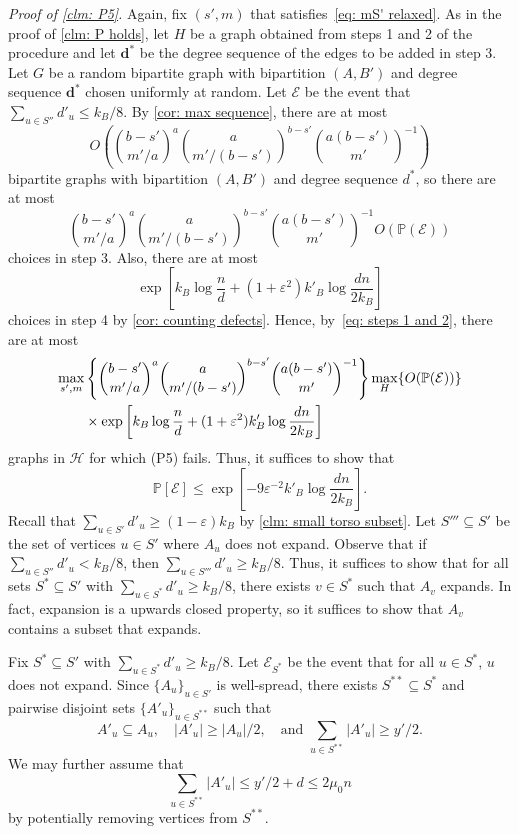 \documentclass[11pt]{article}
\newcommand{\eps}{\varepsilon}
\def\P{\mathbb P}
\theoremstyle{plain}
\begin{document}
\medskip
\noindent\textit{Proof of \cref{clm: P5}.}
Again, fix $(s',m)$ that satisfies~\eqref{eq: mS' relaxed}. As in the proof of \cref{clm: P holds}, let $H$ be a graph obtained from steps 1 and 2 of the procedure and let $\mathbf d^*$ be the degree sequence of the edges to be added in step 3. Let $G$ be a random bipartite graph with bipartition $(A, B')$ and degree sequence $\mathbf d^*$ chosen uniformly at random. Let $\mathcal E$ be the event that $\sum_{u \in S''}d'_u \leq k_B/8$. By \cref{cor: max sequence}, there are at most 
\[
O\left(\binom{b-s'}{m'/a}^a\binom{a}{m'/(b - s')}^{b - s'}\binom{a(b - s')}{m'}^{-1}\right)
\]
bipartite graphs with bipartition $(A, B')$ and degree sequence $d^*$, so there are at most 
\begin{equation}\label{eq: P4 step 3}
    \binom{b-s'}{m'/a}^a\binom{a}{m'/(b - s')}^{b - s'}\binom{a(b - s')}{m'}^{-1}O(\P(\mathcal E))
\end{equation}
choices in step 3. Also, there are at most 
\begin{equation}
    \exp\left[k_B\log\frac{n}{d} + (1 + \eps^2)k'_B\log\frac{dn}{2k_B}\right]
\end{equation}
choices in step 4 by \cref{cor: counting defects}. Hence, by~\eqref{eq: steps 1 and 2}, there are at most 
\begin{align}
    \max_{s',m}&\left\{\binom{b-s'}{m'/a}^a\binom{a}{m'/(b - s')}^{b - s'}\binom{a(b - s')}{m'}^{-1}\right\}\max_{H}\{O(\P(\mathcal E))\}\notag\\
    &\times \exp\left[k_B\log\frac{n}{d} + (1 + \eps^2)k'_B\log\frac{dn}{2k_B}\right]\notag
\end{align}
graphs in $\mathcal H$ for which (P5) fails. Thus, it suffices to show that 
\begin{equation}\label{eq: desired prob P5}
    \P[\mathcal E] \leq \exp\left[-9\eps^{-2}k'_B\log\frac{dn}{2k_B}\right].
\end{equation}
Recall that $\sum_{u \in S'}d'_u \geq (1 - \eps)k_B$ by \cref{clm: small torso subset}. Let $S'''\subseteq S'$ be the set of vertices $u\in S'$ where $A_u$ does not expand. Observe that if $\sum_{u \in S''}d'_u < k_B/8$, then $\sum_{u \in S'''}d'_u \geq k_B/8$. Thus, it suffices to show that for all sets $S^* \subseteq S'$ with $\sum_{u \in S^*}d'_u \geq k_B/8$, there exists  $v \in S^*$ such that $A_v$ expands. In fact, expansion is a upwards closed property, so it suffices to show that $A_v$ contains a subset that expands. 

Fix $S^* \subseteq S'$ with $\sum_{u \in S^*}d'_u \geq k_B/8$. Let $\mathcal E_{S^*}$ be the event that for all $u \in S^*$, $u$ does not expand. Since $\{A_u\}_{u \in S'}$ is well-spread, there exists $S^{**} \subseteq S^*$ and pairwise disjoint sets $\{A'_u\}_{u \in S^{**}}$ such that
\begin{equation}
    A'_u \subseteq A_u, \quad |A'_u| \geq |A_u|/2, \quad \text{and }\sum_{u \in S^{**}}|A'_u| \geq y'/2.
\end{equation}
We may further assume that 
\begin{equation}\label{eq: S** not too big}
    \sum_{u \in S^{**}}|A'_u| \leq y'/2 + d \leq 2\mu_0 n
\end{equation}
by potentially removing vertices from $S^{**}$.
\end{document}
